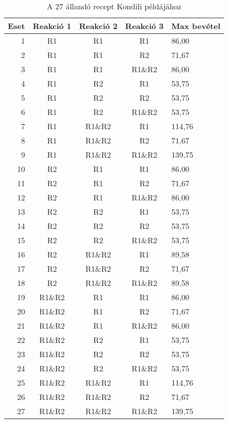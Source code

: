 \begin{table}[H]
	\begin{center}
		\caption{A 27 állandó recept Kondili példájához}
		\captionsetup[table]{skip=10pt}
		\begin{tabular}{r|ccc|l}
		Eset & Reakció 1 & Reakció 2 & Reakció 3 & Max bevétel  \\ 
		\hline
		1    & R1        & R1        & R1        & 86,00        \\
		2    & R1        & R1        & R2        & 71,67        \\
		3    & R1        & R1        & R1\&R2    & 86,00        \\
		4    & R1        & R2        & R1        & 53,75        \\
		5    & R1        & R2        & R2        & 53,75        \\
		6    & R1        & R2        & R1\&R2    & 53,75        \\
		7    & R1        & R1\&R2    & R1        & 114,76       \\
		8    & R1        & R1\&R2    & R2        & 71,67        \\
		9    & R1        & R1\&R2    & R1\&R2    & 139,75       \\
		10   & R2        & R1        & R1        & 86,00        \\
		11   & R2        & R1        & R2        & 71,67        \\
		12   & R2        & R1        & R1\&R2    & 86,00        \\
		13   & R2        & R2        & R1        & 53,75        \\
		14   & R2        & R2        & R2        & 53,75        \\
		15   & R2        & R2        & R1\&R2    & 53,75        \\
		16   & R2        & R1\&R2    & R1        & 89,58        \\
		17   & R2        & R1\&R2    & R2        & 71,67        \\
		18   & R2        & R1\&R2    & R1\&R2    & 89,58        \\
		19   & R1\&R2    & R1        & R1        & 86,00        \\
		20   & R1\&R2    & R1        & R2        & 71,67        \\
		21   & R1\&R2    & R1        & R1\&R2    & 86,00        \\
		22   & R1\&R2    & R2        & R1        & 53,75        \\
		23   & R1\&R2    & R2        & R2        & 53,75        \\
		24   & R1\&R2    & R2        & R1\&R2    & 53,75        \\
		25   & R1\&R2    & R1\&R2    & R1        & 114,76       \\
		26   & R1\&R2    & R1\&R2    & R2        & 71,67        \\
		27   & R1\&R2    & R1\&R2    & R1\&R2    & 139,75      
		\end{tabular}
	\end{center}
\end{table}

